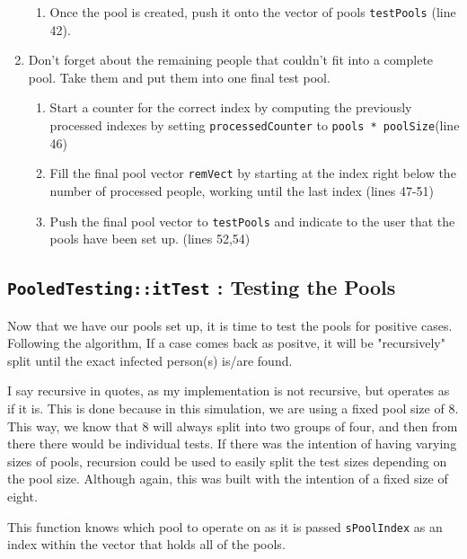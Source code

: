 \documentclass[letterpaper, 10pt]{article}
\begin{document}
\begin{enumerate}
\begin{enumerate}
            \item Once the pool is created, push it onto the vector of pools \texttt{testPools} (line 42).
        \end{enumerate}
    \item Don't forget about the remaining people that couldn't fit into a complete pool. Take them and put them into one final test pool.
        \begin{enumerate}
            \item Start a counter for the correct index by computing the previously processed indexes by setting \texttt{processedCounter} to   \texttt{pools * poolSize}(line 46)
            \item Fill the final pool vector \texttt{remVect} by starting at the index right below the number of processed people, working until the last index (lines 47-51)
            \item Push the final pool vector to \texttt{testPools} and indicate to the user that the pools have been set up. (lines 52,54)
        \end{enumerate}
     
\end{enumerate}

\subsection{\texttt{PooledTesting::itTest} : Testing the Pools}

Now that we have our pools set up, it is time to test the pools for positive cases. Following the algorithm, If a case comes back as positve, it will be "recursively" split until the exact infected person(s) is/are found. 

I say recursive in quotes, as my implementation is not recursive, but operates as if it is. This is done because in this simulation, we are using a fixed pool size of 8. This way, we know that 8 will always split into two groups of four, and then from there there would be individual tests. If there was the intention of having varying sizes of pools, recursion could be used to easily split the test sizes depending on the pool size. Although again, this was built with the intention of a fixed size of eight.

This function knows which pool to operate on as it is passed \texttt{sPoolIndex} as an index within the vector that holds all of the pools.

\vspace{1em}
\end{document}

